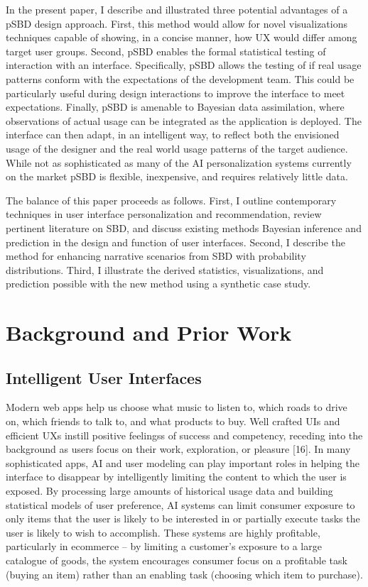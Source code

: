 \documentclass[]{article}
\begin{document}
In the present paper, I describe and illustrated three potential
advantages of a pSBD design approach. First, this method would allow for
novel visualizations techniques capable of showing, in a concise manner,
how UX would differ among target user groups. Second, pSBD enables the
formal statistical testing of interaction with an interface.
Specifically, pSBD allows the testing of if real usage patterns conform
with the expectations of the development team. This could be
particularly useful during design interactions to improve the interface
to meet expectations. Finally, pSBD is amenable to Bayesian data
assimilation, where observations of actual usage can be integrated as
the application is deployed. The interface can then adapt, in an
intelligent way, to reflect both the envisioned usage of the designer
and the real world usage patterns of the target audience. While not as
sophisticated as many of the AI personalization systems currently on the
market pSBD is flexible, inexpensive, and requires relatively little
data.

The balance of this paper proceeds as follows. First, I outline
contemporary techniques in user interface personalization and
recommendation, review pertinent literature on SBD, and discuss existing
methods Bayesian inference and prediction in the design and function of
user interfaces. Second, I describe the method for enhancing narrative
scenarios from SBD with probability distributions. Third, I illustrate
the derived statistics, visualizations, and prediction possible with the
new method using a synthetic case study.

\section{Background and Prior Work}\label{background-and-prior-work}

\subsection{Intelligent User
Interfaces}\label{intelligent-user-interfaces}

Modern web apps help us choose what music to listen to, which roads to
drive on, which friends to talk to, and what products to buy. Well
crafted UIs and efficient UXs instill positive feelingss of success and
competency, receding into the background as users focus on their work,
exploration, or pleasure {[}16{]}. In many sophisticated apps, AI and
user modeling can play important roles in helping the interface to
disappear by intelligently limiting the content to which the user is
exposed. By processing large amounts of historical usage data and
building statistical models of user preference, AI systems can limit
consumer exposure to only items that the user is likely to be interested
in or partially execute tasks the user is likely to wish to accomplish.
These systems are highly profitable, particularly in ecommerce -- by
limiting a customer's exposure to a large catalogue of goods, the system
encourages consumer focus on a profitable task (buying an item) rather
than an enabling task (choosing which item to purchase).
\end{document}
